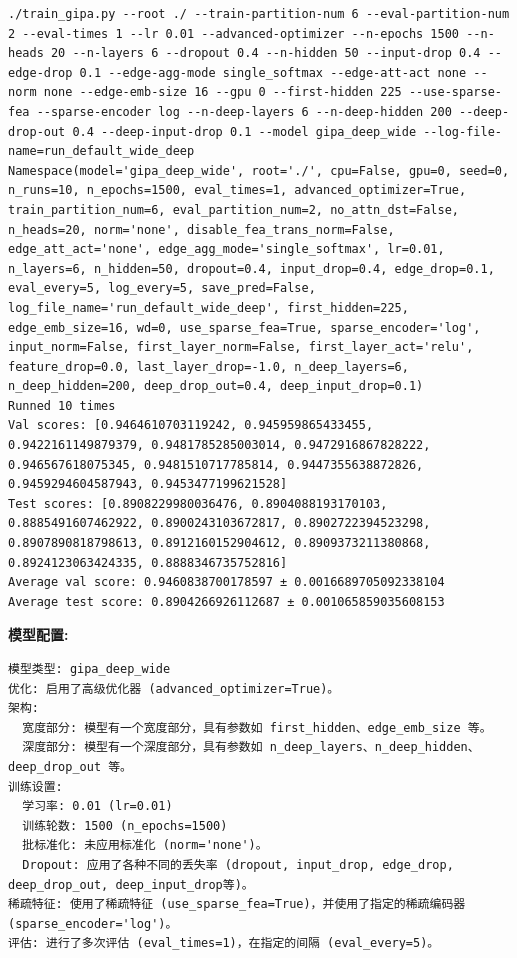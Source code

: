 \documentclass{article}
\begin{document}
\begin{verbatim}
./train_gipa.py --root ./ --train-partition-num 6 --eval-partition-num 2 --eval-times 1 --lr 0.01 --advanced-optimizer --n-epochs 1500 --n-heads 20 --n-layers 6 --dropout 0.4 --n-hidden 50 --input-drop 0.4 --edge-drop 0.1 --edge-agg-mode single_softmax --edge-att-act none --norm none --edge-emb-size 16 --gpu 0 --first-hidden 225 --use-sparse-fea --sparse-encoder log --n-deep-layers 6 --n-deep-hidden 200 --deep-drop-out 0.4 --deep-input-drop 0.1 --model gipa_deep_wide --log-file-name=run_default_wide_deep
Namespace(model='gipa_deep_wide', root='./', cpu=False, gpu=0, seed=0, n_runs=10, n_epochs=1500, eval_times=1, advanced_optimizer=True, train_partition_num=6, eval_partition_num=2, no_attn_dst=False, n_heads=20, norm='none', disable_fea_trans_norm=False, edge_att_act='none', edge_agg_mode='single_softmax', lr=0.01, n_layers=6, n_hidden=50, dropout=0.4, input_drop=0.4, edge_drop=0.1, eval_every=5, log_every=5, save_pred=False, log_file_name='run_default_wide_deep', first_hidden=225, edge_emb_size=16, wd=0, use_sparse_fea=True, sparse_encoder='log', input_norm=False, first_layer_norm=False, first_layer_act='relu', feature_drop=0.0, last_layer_drop=-1.0, n_deep_layers=6, n_deep_hidden=200, deep_drop_out=0.4, deep_input_drop=0.1)
Runned 10 times
Val scores: [0.9464610703119242, 0.945959865433455, 0.9422161149879379, 0.9481785285003014, 0.9472916867828222, 0.946567618075345, 0.9481510717785814, 0.9447355638872826, 0.9459294604587943, 0.9453477199621528]
Test scores: [0.8908229980036476, 0.8904088193170103, 0.8885491607462922, 0.8900243103672817, 0.8902722394523298, 0.8907890818798613, 0.8912160152904612, 0.8909373211380868, 0.8924123063424335, 0.8888346735752816]
Average val score: 0.9460838700178597 ± 0.0016689705092338104
Average test score: 0.8904266926112687 ± 0.001065859035608153
\end{verbatim}

\textbf{模型配置:}

\begin{verbatim}
模型类型: gipa_deep_wide
优化: 启用了高级优化器 (advanced_optimizer=True)。
架构:
  宽度部分: 模型有一个宽度部分，具有参数如 first_hidden、edge_emb_size 等。
  深度部分: 模型有一个深度部分，具有参数如 n_deep_layers、n_deep_hidden、deep_drop_out 等。
训练设置:
  学习率: 0.01 (lr=0.01)
  训练轮数: 1500 (n_epochs=1500)
  批标准化: 未应用标准化 (norm='none')。
  Dropout: 应用了各种不同的丢失率 (dropout, input_drop, edge_drop, deep_drop_out, deep_input_drop等)。
稀疏特征: 使用了稀疏特征 (use_sparse_fea=True)，并使用了指定的稀疏编码器 (sparse_encoder='log')。
评估: 进行了多次评估 (eval_times=1)，在指定的间隔 (eval_every=5)。
\end{verbatim}
\end{document}

